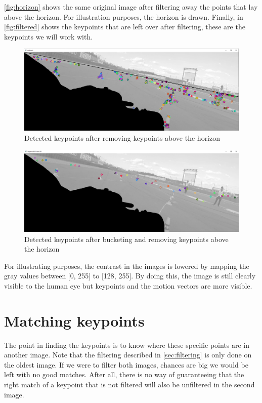 \autoref{fig:horizon} shows the same original image after filtering away the points that lay above the horizon. For illustration purposes, the horizon is drawn. Finally, in \autoref{fig:filtered} shows the keypoints that are left over after filtering, these are the keypoints we will work with.\bigskip

\begin{figure}
    \centering
    \includegraphics[width=1\textwidth]{figures/Horizon_filtered.png}
    \caption{Detected keypoints after removing keypoints above the horizon}
    \label{fig:horizon}
\end{figure}
\begin{figure}
    \centering
    \includegraphics[width=1\textwidth]{figures/Filtered_keypoints.png}
    \caption{Detected keypoints after bucketing and removing keypoints above the horizon}
    \label{fig:filtered}
\end{figure}

For illustrating purposes, the contrast in the images is lowered by mapping the gray values between [0, 255] to [128, 255]. By doing this, the image is still clearly visible to the human eye but keypoints and the motion vectors are more visible.

\section{Matching keypoints}\label{sec:matching}
The point in finding the keypoints is to know where these specific points are in another image. Note that the filtering described in \autoref{sec:filtering} is only done on the oldest image. If we were to filter both images, chances are big we would be left with no good matches. After all, there is no way of guaranteeing that the right match of a keypoint that is not filtered will also be unfiltered in the second image.\bigskip

